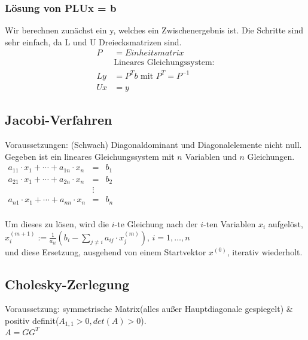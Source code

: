 \documentclass[a4paper, 8pt, landscape]{extarticle}
\let\oldsum\sum
\renewcommand{\sum}{\ensuremath{\textstyle\oldsum}}
\begin{document}
\begin{multicols*}{5}
			\subsubsection{Lösung von PLUx = b}
				Wir berechnen zunächst ein y, welches ein Zwischenergebnis ist. Die Schritte sind sehr einfach, da L und U Dreiecksmatrizen sind.
				\begin{align*}
					P  &= Einheitsmatrix\\
					&\text{Lineares Gleichungssystem:}\\
					Ly &= P^Tb \text{ mit } P^T = P^{-1}\\
					Ux &= y
				\end{align*}
		\subsection{Jacobi-Verfahren}
			Voraussetzungen: (Schwach) Diagonaldominant und Diagonalelemente nicht null.
			Gegeben ist ein lineares Gleichungssystem mit $n$ Variablen und $n$ Gleichungen.
			$
			\begin{matrix}
				a_{11}\cdot x_1+\dotsb+a_{1n}\cdot x_n&=&b_1\\
				a_{21}\cdot x_1+\dotsb+a_{2n}\cdot x_n&=&b_2\\
				&\vdots&\\
				a_{n1}\cdot x_1+\dotsb+a_{nn}\cdot x_n&=&b_n\\
			\end{matrix}
			$

			Um dieses zu lösen, wird die $i$-te Gleichung nach der $i$-ten Variablen $x_i$ aufgelöst,\\
			$x_i^{(m+1)}:=\frac1{a_{ii}}\left(b_i-\sum_{j\not=i} a_{ij}\cdot x_j^{(m)}\right), \, i=1,\dotsc,n$\\
			und diese Ersetzung, ausgehend von einem Startvektor $x^{(0)}$, iterativ wiederholt.
		\subsection{Cholesky-Zerlegung}
			Voraussetzung: symmetrische Matrix(alles außer Hauptdiagonale gespiegelt) \& positiv definit($A_{1,1}>0, det(A)>0$).\\
			$A=GG^{T}$\\


\end{multicols*}
\end{document}

